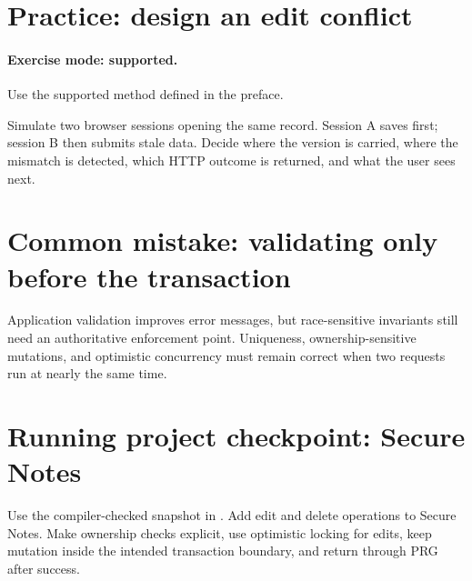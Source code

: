 \section{Practice: design an edit conflict}
\paragraph{Exercise mode: supported.} Use the supported method defined in the preface.

Simulate two browser sessions opening the same record. Session A saves first; session B then submits stale data. Decide where the version is carried, where the mismatch is detected, which HTTP outcome is returned, and what the user sees next.

\section{Common mistake: validating only before the transaction}
Application validation improves error messages, but race-sensitive invariants still need an authoritative enforcement point. Uniqueness, ownership-sensitive mutations, and optimistic concurrency must remain correct when two requests run at nearly the same time.

\section{Running project checkpoint: Secure Notes}
Use the compiler-checked snapshot in . Add edit and delete operations to Secure Notes. Make ownership checks explicit, use optimistic locking for edits, keep mutation inside the intended transaction boundary, and return through PRG after success.
